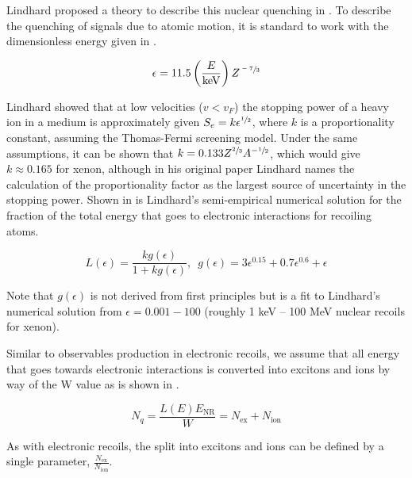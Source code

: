 Lindhard proposed a theory to describe this nuclear quenching in .  To describe the quenching of signals due to atomic motion, it is standard to work with the dimensionless energy given in .

\begin{equation}
        \label{eqn:dimensionless_energy}
        \epsilon = 11.5 \left( \frac{E}{\textrm{keV}} \right) Z^{\sfrac{-7}{3}}
\end{equation}

Lindhard showed that at low velocities ($v < v_F$) the stopping power of a heavy ion in a medium is approximately given $S_e = k \epsilon^{\sfrac{1}{2}}$, where $k$ is a proportionality constant, assuming the Thomas-Fermi screening model.  Under the same assumptions, it can be shown that $k = 0.133 Z^{\sfrac{2}{3}} A^{-\sfrac{1}{2}}$, which would give $k \approx 0.165$ for xenon, although in his original paper Lindhard names the calculation of the proportionality factor as the largest source of uncertainty in the stopping power.  Shown in  is Lindhard's semi-empirical numerical solution for the fraction of the total energy that goes to electronic interactions for recoiling atoms.

\begin{equation}
        \label{eqn:lindhard_electronic}
        L(\epsilon) = \frac{k g(\epsilon)}{1 + k g(\epsilon)}, \, \, \, g(\epsilon) = 3 \epsilon^{0.15} + 0.7 \epsilon^{0.6} + \epsilon
\end{equation}

Note that $g(\epsilon)$ is not derived from first principles but is a fit to Lindhard's numerical solution from $\epsilon = 0.001 - 100$ (roughly 1 keV -- 100 MeV nuclear recoils for xenon).

Similar to observables production in electronic recoils, we assume that all energy that goes towards electronic interactions is converted into excitons and ions by way of the W value as is shown in .

\begin{equation}
        \label{eqn:quanta_nr}
        N_q = \frac{L(E) E_{\textrm{NR}}}{W} = N_{\textrm{ex}} + N_{\textrm{ion}}
\end{equation}

As with electronic recoils, the split into excitons and ions can be defined by a single parameter, $\frac{N_{\textrm{ex}}}{N_{\textrm{ion}}}$.

